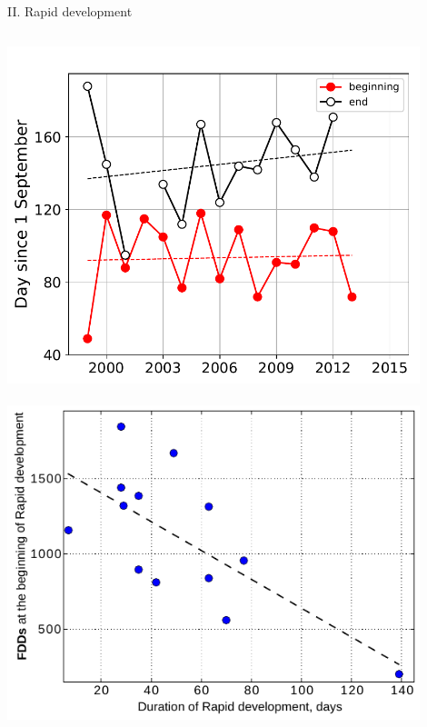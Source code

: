 \documentclass[8pt]{beamer}
\begin{document}
\setwatermark{\fontsize{125pt}{125pt}\selectfont{}}
\begin{frame}[fragile]{II. Rapid development}
	\begin{columns}
		\includegraphics[width=0.9\textwidth]{./img/Rgrth_LS.pdf}\\~\\
		\includegraphics[width=0.9\textwidth]{./img/RGRTH_FDD.pdf}\\~\\
	\end{columns}
	

\end{frame}
\end{document}
